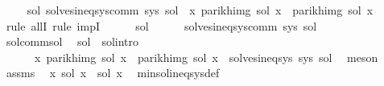 \begin{isabellebody}
\isanewline
\ \ \isamarkupfalse%
\ {\isachardoublequoteopen}\ {\isasymforall}sol{\isacharprime}{\kern0pt}{\isachardot}{\kern0pt}\ solves{\isacharunderscore}{\kern0pt}ineq{\isacharunderscore}{\kern0pt}sys{\isacharunderscore}{\kern0pt}comm\ sys\ sol{\isacharprime}{\kern0pt}\ {\isasymlongrightarrow}\ {\isacharparenleft}{\kern0pt}{\isasymforall}x{\isachardot}{\kern0pt}\ parikh{\isacharunderscore}{\kern0pt}img\ {\isacharparenleft}{\kern0pt}sol\ x{\isacharparenright}{\kern0pt}\ {\isasymsubseteq}\ parikh{\isacharunderscore}{\kern0pt}img\ {\isacharparenleft}{\kern0pt}sol{\isacharprime}{\kern0pt}\ x{\isacharparenright}{\kern0pt}{\isacharparenright}{\kern0pt}{\isachardoublequoteclose}\isanewline
\ \ \isamarkupfalse%
\ {\isacharparenleft}{\kern0pt}rule\ allI{\isacharcomma}{\kern0pt}\ rule\ impI{\isacharparenright}{\kern0pt}\isanewline
\ \ \ \ \isamarkupfalse%
\ sol{\isacharprime}{\kern0pt}\isanewline
\ \ \ \ \isamarkupfalse%
\ {\isachardoublequoteopen}solves{\isacharunderscore}{\kern0pt}ineq{\isacharunderscore}{\kern0pt}sys{\isacharunderscore}{\kern0pt}comm\ sys\ sol{\isacharprime}{\kern0pt}{\isachardoublequoteclose}\isanewline
\ \ \ \ \isamarkupfalse%
\ sol{\isacharunderscore}{\kern0pt}comm{\isacharunderscore}{\kern0pt}sol\ \isamarkupfalse%
\ sol{\isacharprime}{\kern0pt}{\isacharprime}{\kern0pt}\ \ sol{\isacharprime}{\kern0pt}{\isacharprime}{\kern0pt}{\isacharunderscore}{\kern0pt}intro{\isacharcolon}{\kern0pt}\isanewline
\ \ \ \ \ \ {\isachardoublequoteopen}{\isacharparenleft}{\kern0pt}{\isasymforall}x{\isachardot}{\kern0pt}\ parikh{\isacharunderscore}{\kern0pt}img\ {\isacharparenleft}{\kern0pt}sol{\isacharprime}{\kern0pt}\ x{\isacharparenright}{\kern0pt}\ {\isacharequal}{\kern0pt}\ parikh{\isacharunderscore}{\kern0pt}img\ {\isacharparenleft}{\kern0pt}sol{\isacharprime}{\kern0pt}{\isacharprime}{\kern0pt}\ x{\isacharparenright}{\kern0pt}{\isacharparenright}{\kern0pt}\ {\isasymand}\ solves{\isacharunderscore}{\kern0pt}ineq{\isacharunderscore}{\kern0pt}sys\ sys\ sol{\isacharprime}{\kern0pt}{\isacharprime}{\kern0pt}{\isachardoublequoteclose}\ \isamarkupfalse%
\ meson\isanewline
\ \ \ \ \isamarkupfalse%
\ assms\ \isamarkupfalse%
\ {\isachardoublequoteopen}{\isasymforall}x{\isachardot}{\kern0pt}\ sol\ x\ {\isasymsubseteq}\ sol{\isacharprime}{\kern0pt}{\isacharprime}{\kern0pt}\ x{\isachardoublequoteclose}\ \isamarkupfalse%
\ min{\isacharunderscore}{\kern0pt}sol{\isacharunderscore}{\kern0pt}ineq{\isacharunderscore}{\kern0pt}sys{\isacharunderscore}{\kern0pt}def\ \isamarkupfalse%

\end{isabellebody}
